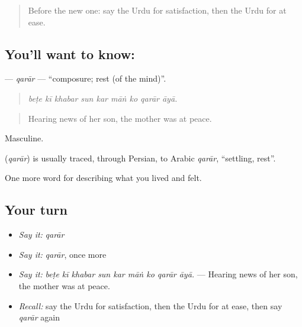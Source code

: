 \begin{quote}
Before the new one: say the Urdu for satisfaction, then the Urdu for at ease.
\end{quote}

\subsection*{You'll want to know: }
\textbf{} — \emph{qarār} — \textquotedblleft{}composure; rest (of the mind)\textquotedblright{}.

\begin{quote}
        
\end{quote}

\begin{quote}
\emph{beṭe kī khabar sun kar māṅ ko qarār āyā.}
\end{quote}

\begin{quote}
Hearing news of her son, the mother was at peace.
\end{quote}

Masculine.

\begin{cousinweb}
\textbf{} (\emph{qarār}) is usually traced, through Persian, to Arabic \emph{qarār}, \textquotedblleft{}settling, rest\textquotedblright{}.
\end{cousinweb}

\begin{grammarlens}[title={What you've built}]
One more word for describing what you lived and felt.
\end{grammarlens}

\subsection*{Your turn}
\begin{itemize}
\raggedright
  \item \emph{Say it:} \emph{qarār}
  \item \emph{Say it:} \emph{qarār}, once more
  \item \emph{Say it:} \emph{beṭe kī khabar sun kar māṅ ko qarār āyā.} — Hearing news of her son, the mother was at peace.
  \item \emph{Recall:} say the Urdu for satisfaction, then the Urdu for at ease, then say \emph{qarār} again
\end{itemize}

